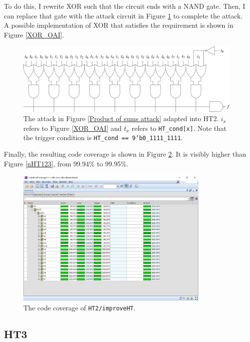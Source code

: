 \documentclass{article}
\begin{document}
To do this, I rewrite XOR such that the circuit ends with a NAND gate. Then, I can replace that gate with the attack circuit in Figure \ref{improvedHT2} to complete the attack. A possible implementation of XOR that satisfies the requirement is shown in Figure \ref{XOR_OAI}.

\begin{figure}[h] \centering
\includegraphics[width=\textwidth]{improvedHT2}
\caption{The attack in Figure \ref{Product of sums attack} adapted into HT2. $i_x$ refers to Figure \ref{XOR_OAI} and $t_x$ refers to \texttt{HT\_cond[x]}. Note that the trigger condition is \texttt{HT\_cond == 9'b0\_1111\_1111}.}
\label{improvedHT2}
\end{figure}

Finally, the resulting code coverage is shown in Figure \ref{improveHT2}. It is visibly higher than Figure \ref{nHT123}, from 99.94\% to 99.95\%.

\begin{figure}[t] \centering
\includegraphics[width=0.85\textwidth]{improveHT2}
\caption{The code coverage of \texttt{HT2/improveHT}.}
\label{improveHT2}
\end{figure}

\subsection{HT3}
\end{document}
